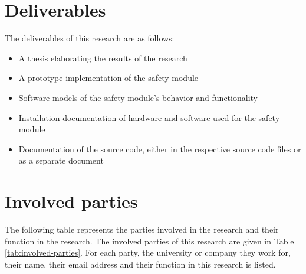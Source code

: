 \documentclass[12pt]{scrreprt}
\begin{document}
\section{Deliverables}
\label{Deliverables}
The deliverables of this research are as follows:

\begin{itemize}
    \item A thesis elaborating the results of the research
    \item A prototype implementation of the safety module
    \item Software models of the safety module's behavior and functionality
    \item Installation documentation of hardware and software used for the safety module
    \item Documentation of the source code, either in the respective source code files or as a separate document
\end{itemize}

\section{Involved parties}
\label{Parties involved and communication scheme}
The following table represents the parties involved in the research and their function in the research.
The involved parties of this research are given in Table \ref{tab:involved-parties}. For each party, the university or company they work for, their name, their email address and their function in this research is listed.
\end{document}
